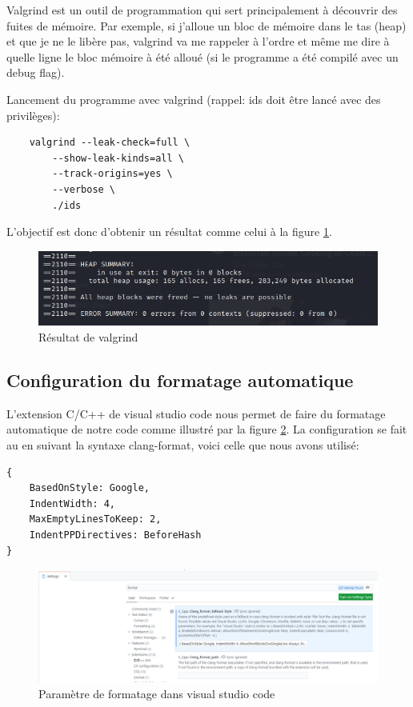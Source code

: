 \documentclass[a4paper]{article}
\begin{document}
Valgrind est un outil de programmation qui sert principalement à découvrir des fuites de mémoire. Par exemple, si j'alloue un bloc de mémoire dans le tas (heap) et que je ne le libère pas, valgrind va me rappeler à l'ordre et même me dire à quelle ligne le bloc mémoire à été alloué (si le programme a été compilé avec un debug flag).

Lancement du programme avec valgrind (rappel: ids doit être lancé avec des privilèges):
{\small \begin{verbatim}
    valgrind --leak-check=full \
        --show-leak-kinds=all \
        --track-origins=yes \
        --verbose \
        ./ids
\end{verbatim}}

L'objectif est donc d'obtenir un résultat comme celui à la figure \ref{fig:valgrind}.

\begin{figure}[H]
    \centering
    \includegraphics[width=0.75\linewidth]{../markdown-explanations/images/valgrind-01.PNG}
    \caption{Résultat de valgrind}
    \label{fig:valgrind}
\end{figure}





\subsection{Configuration du formatage automatique}



L'extension C/C++ de visual studio code nous permet de faire du formatage automatique de notre code comme illustré par la figure \ref{fig:formatting}. La configuration se fait au en suivant la syntaxe clang-format, voici celle que nous avons utilisé:

{\small\begin{verbatim}
{
    BasedOnStyle: Google,
    IndentWidth: 4,
    MaxEmptyLinesToKeep: 2,
    IndentPPDirectives: BeforeHash
}
\end{verbatim}}

\begin{figure}[H]
    \centering
    \includegraphics[width=0.99\linewidth]{../markdown-explanations/images/setup-04.PNG}
    \caption{Paramètre de formatage dans visual studio code}
    \label{fig:formatting}
\end{figure}
\end{document}

